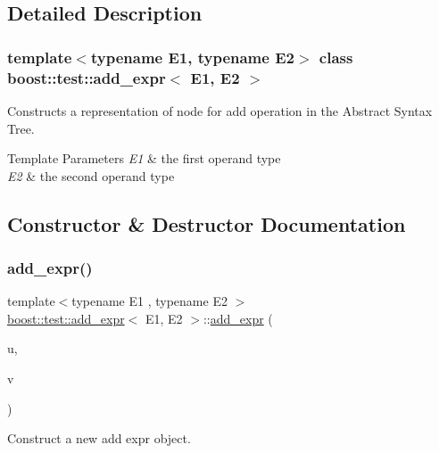 \subsection{Detailed Description}
\subsubsection*{template$<$typename E1, typename E2$>$\newline
class boost\+::test\+::add\+\_\+expr$<$ E1, E2 $>$}

Constructs a representation of node for add operation in the Abstract Syntax Tree. 


\begin{DoxyTemplParams}{Template Parameters}
{\em E1} & the first operand type \\
\hline
{\em E2} & the second operand type \\
\hline
\end{DoxyTemplParams}


\subsection{Constructor \& Destructor Documentation}
\mbox{\label{classboost_1_1test_1_1add__expr_af71312b5da7142245e8aaa7b3f0f1889}} 
\subsubsection{\texorpdfstring{add\_expr()}{add\_expr()}}
{\footnotesize\ttfamily template$<$typename E1 , typename E2 $>$ \\
\mbox{\hyperlink{classboost_1_1test_1_1add__expr}{boost\+::test\+::add\+\_\+expr}}$<$ E1, E2 $>$\+::\mbox{\hyperlink{classboost_1_1test_1_1add__expr}{add\+\_\+expr}} (\begin{DoxyParamCaption}\item[{E1 const \&}]{u,  }\item[{E2 const \&}]{v }\end{DoxyParamCaption})\hspace{0.3cm}{\ttfamily [inline]}}



Construct a new add expr object. 


